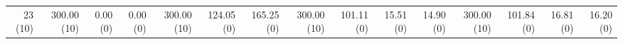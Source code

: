 \documentclass[11pt,fleqn,twoside]{article}
\begin{document}
{\begin{table}[t]
\begin{tabular}[t]{|r|r|r|r|r|r|r|r|r|r|r|r|r|r|r|}
23 (10) & 300.00 (10) & 0.00 (0) & 0.00 (0) & 300.00 (10) & 124.05 (0) & 165.25 (0) & 300.00 (10) & 101.11 (0) & 15.51 (0) & 14.90 (0) & 300.00 (10) & 101.84 (0) & 16.81 (0) & 16.20 (0) \\
%
%

\end{tabular}
\end{table}}
\end{document}
